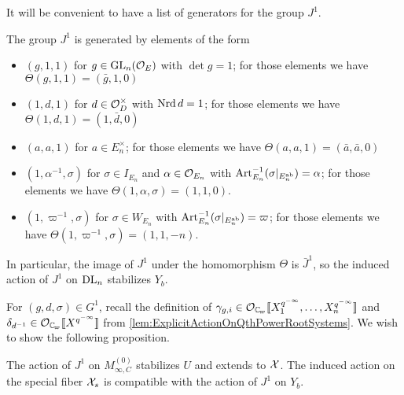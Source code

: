 \documentclass[../main.tex]{subfiles}
\begin{document}
It will be convenient to have a list of generators for the group $J^1$. 
\begin{lem}\label{lem:GeneratorsForJ1}
  The group $J^1$ is generated by elements of the form
  \begin{itemize}
    \item $(g,1,1)$ for $g \in \operatorname{GL}_n(\mathcal{O}_E)$ with $\det g = 1$; for those
      elements we have $\Theta(g,1,1) = (\bar g, 1,0)$
    \item $(1,d,1)$ for $d \in \mathcal{O}_D^\times$ with $\operatorname{Nrd} d = 1$; for those
      elements we have $\Theta(1,d,1) = (1 , \bar d,0)$
    \item $(a,a,1)$ for $a \in E_n^\times$; for those
      elements we have $\Theta(a,a,1) = (\bar a, \bar a,0)$
    \item $(1, \alpha^{-1}, \sigma)$ for $\sigma \in I_{E_n}$ 
      and $\alpha \in \mathcal{O}_{E_n}$ with $\operatorname{Art}_{E_n}^{-1}(\sigma|_{E_n^{\mathrm{ab}}}) = \alpha$;
      for those elements we have $\Theta(1,\alpha,\sigma) = (1, 1,0)$.
    \item $(1, \varpi^{-1}, \sigma)$ for $\sigma \in W_{E_n}$ with
      $\operatorname{Art}^{-1}_{E_n}(\sigma|_{E_n^{\mathrm{ab}}}) = \varpi$; for those
      elements we have $\Theta(1,\varpi^{-1},\sigma) = (1, 1, -n)$. 
  \end{itemize}
  \end{lem}
In particular, the image of $J^1$ under the homomorphism $\Theta$ is 
$\bar J^1$, so the induced action of $J^1$ on $\mathrm{DL}_n$ stabilizes $Y_b$.

For $(g,d,\sigma) \in G^1$, recall the definition of $\gamma_{g,i} \in \cO_\Cp\llbr
X_1^{q^{-\infty}}, \dots, X_n^{q^{-\infty}}\rrbr$ and 
$\delta_{d^{-1}} \in \cO_\Cp \llbr X^{q^{-\infty}} \rrbr$ from 
\cref{lem:ExplicitActionOnQthPowerRootSystems}. 
We wish to show the following proposition.

\begin{prop}\label{prop:J1ActionOnAffinoid}
  The action of $J^1$ on $M_{\infty, C}^{(0)}$ stabilizes $U$ and extends to
  $\mathcal{X}$. The induced action on the special fiber $\mathcal{X}_s$ is compatible with the
  action of $J^1$ on $Y_b$.
\end{prop}
\end{document}
